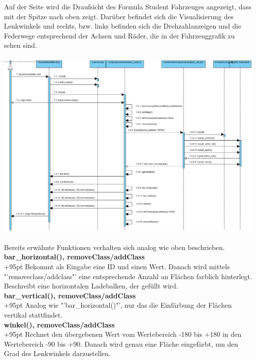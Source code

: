 \documentclass[fontsize = 12pt, paper = a4]{scrreprt}
\begin{document}
Auf der Seite wird die Draufsicht des Formula Student Fahrzeuges angezeigt, dass mit der Spitze nach oben zeigt. Darüber befindet sich die Visualisierung des Lenkwinkels und rechts, bzw. links befinden sich die Drehzahlanzeigen und die Federwege entsprechend der Achsen und Räder, die in der Fahrzeuggrafik zu sehen sind.
\\ \\
\includegraphics[scale=0.485]{dynamischedaten.png}
\\ \\
Bereits erwähnte Funktionen verhalten sich analog wie oben beschrieben.\\


\textbf{bar\_horizontal(), removeClass/addClass}\\
\hangindent+95pt  
Bekommt als Eingabe eine ID und einen Wert. Danach wird mittels "'removeclass/addclass"' eine entsprechende Anzahl an Flächen farblich hinterlegt. Beschreibt eine horizontalen Ladebalken, der gefüllt wird.\\


\textbf{bar\_vertical(), removeClass/addClass}\\
\hangindent+95pt  
Analog wie "'bar\_horizontal()"', nur das die Einfärbung der Flächen vertikal stattfindet.\\ 


\textbf{winkel(), removeClass/addClass}\\
\hangindent+95pt 
Rechnet den übergebenen Wert vom Wertebereich -180 bis +180 in den Wertebereich -90 bis +90. Danach wird genau eine Fläche eingefärbt, um den Grad des Lenkwinkels darzustellen.
\end{document}
